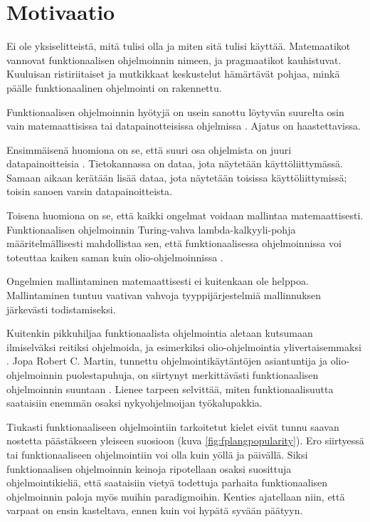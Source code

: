 \clearpage

\chapter{Motivaatio}

Ei ole yksiselitteistä, mitä  tulisi olla ja miten sitä tulisi käyttää. Matemaatikot vannovat funktionaalisen ohjelmoinnin  nimeen, ja pragmaatikot kauhistuvat. Kuuluisan ristiriitaiset ja mutkikkaat keskustelut hämärtävät pohjaa, minkä päälle funktionaalinen ohjelmointi on rakennettu. \citep{stackoverflow_what_monad,stackoverflow:why_monad,promises-spec-94,dear_functional_bros}

Funktionaalisen ohjelmoinnin hyötyjä on usein sanottu löytyvän suurelta osin vain matemaattisissa tai datapainotteisissa ohjelmissa \cite[10]{cantarella_fp_haitat}. Ajatus on haastettavissa.

Ensimmäisenä huomiona on se, että suuri osa ohjelmista on juuri datapainoitteisia \cite{gartnerb2b}. Tietokannassa on dataa, jota näytetään käyttöliittymässä. Samaan aikaan kerätään lisää dataa, jota näytetään toisissa käyttöliittymissä; toisin sanoen varsin datapainoitteista.

Toisena huomiona on se, että kaikki ongelmat voidaan mallintaa matemaattisesti. Funktionaalisen ohjelmoinnin Turing-vahva lambda-kalkyyli-pohja määritelmällisesti mahdollistaa sen, että funktionaalisessa ohjelmoinnissa voi toteuttaa kaiken saman kuin olio-ohjelmoinnissa \cite{Tan2004,computerphile_lambda}.

Ongelmien mallintaminen matemaattisesti ei kuitenkaan ole helppoa. Mallintaminen tuntuu vaativan vahvoja tyyppijärjestelmiä mallinnuksen järkevästi todistamiseksi.

Kuitenkin pikkuhiljaa funktionaalista ohjelmointia aletaan kutsumaan ilmiselväksi reitiksi ohjelmoida, ja esimerkiksi olio-ohjelmointia ylivertaisemmaksi \cite[1]{the_oo_way}. Jopa Robert C. Martin, tunnettu ohjelmointikäytäntöjen asiantuntija ja olio-ohjelmoinnin puolestapuhuja, on siirtynyt merkittävästi funktionaalisen ohjelmoinnin suuntaan \cite{martin2019whyclojure,martin2017pragmaticfp}. Lienee tarpeen selvittää, miten funktionaalisuutta saataisiin enemmän osaksi nykyohjelmoijan työkalupakkia.
\clearpage

Tiukasti funktionaaliseen ohjelmointiin tarkoitetut kielet eivät tunnu saavan nostetta päästäkseen yleiseen suosioon (kuva \ref{fig:fplangpopularity}). Ero siirtyessä  tai  funktionaaliseen ohjelmointiin voi olla kuin yöllä ja päivällä. Siksi funktionaalisen ohjelmoinnin keinoja ripotellaan osaksi suosittuja ohjelmointikieliä, että saataisiin vietyä todettuja parhaita funktionaalisen ohjelmoinnin paloja myös muihin paradigmoihin. Kenties ajatellaan niin, että varpaat on ensin kasteltava, ennen kuin voi hypätä syvään päätyyn.

